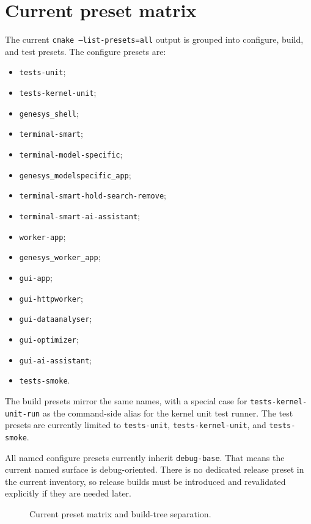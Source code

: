 \section{Current preset matrix}
\label{sec:dev-current-preset-matrix}

The current \texttt{cmake --list-presets=all} output is grouped into configure,
build, and test presets. The configure presets are:
\begin{itemize}
\item \texttt{tests-unit};
\item \texttt{tests-kernel-unit};
\item \texttt{genesys\_shell};
\item \texttt{terminal-smart};
\item \texttt{terminal-model-specific};
\item \texttt{genesys\_modelspecific\_app};
\item \texttt{terminal-smart-hold-search-remove};
\item \texttt{terminal-smart-ai-assistant};
\item \texttt{worker-app};
\item \texttt{genesys\_worker\_app};
\item \texttt{gui-app};
\item \texttt{gui-httpworker};
\item \texttt{gui-dataanalyser};
\item \texttt{gui-optimizer};
\item \texttt{gui-ai-assistant};
\item \texttt{tests-smoke}.
\end{itemize}

The build presets mirror the same names, with a special case for
\texttt{tests-kernel-unit-run} as the command-side alias for the kernel unit
test runner. The test presets are currently limited to
\texttt{tests-unit}, \texttt{tests-kernel-unit}, and \texttt{tests-smoke}.

All named configure presets currently inherit \texttt{debug-base}. That means
the current named surface is debug-oriented. There is no dedicated release
preset in the current inventory, so release builds must be introduced and
revalidated explicitly if they are needed later.

\begin{figure}[htbp]
\centering
\caption{Current preset matrix and build-tree separation.}
\label{fig:dev-preset-matrix}
\end{figure}

